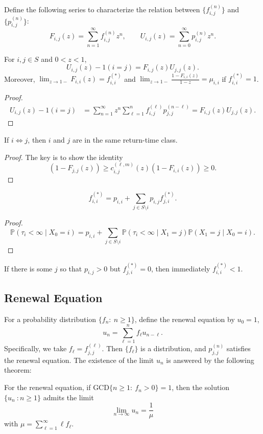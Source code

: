 Define the following series to characterize the relation between $\{f_{i,j}^{(n)}\}$ and $\{p_{i,j}^{(n)}\}$:
\[
F_{i,j}(z)=\sum_{n=1}^\infty f_{i,j}^{(n)}z^n,\qquad
U_{i,j}(z)=\sum_{n=0}^\infty p_{i,j}^{(n)}z^n.
\]
\begin{proposition}
For $i,j\in S$ and $0<z<1$,
\[
U_{i,j}(z)-1(i=j)=F_{i,j}(z)U_{j,j}(z).
\]
Moreover, $\lim_{z\to1-}F_{i,i}(z)=f_{i,i}^{(*)}$ and 
$\lim_{z\to1-}\frac{1-F_{i,i}(z)}{1-z}=\mu_{i,i}$ if $f_{i,i}^{(*)}=1$.
\end{proposition}

\begin{proof}
\begin{align*}
U_{i,j}(z)-1(i=j)&=\sum_{n=1}^\infty z^n\sum_{\ell=1}^nf_{i,j}^{(\ell)}p_{j,j}^{(n-\ell)}=F_{i,j}(z)U_{j,j}(z).
\end{align*}
\end{proof}

\begin{theorem}
If $i\Leftrightarrow j$, then $i$ and $j$ are in the same return-time class.
\end{theorem}
\begin{proof}
The key is to show the identity
\[
(1-F_{j,j}(z))\ge c_{i,j}^{(\ell,m)}(z)(1-F_{i,i}(z))\ge0.
\]
\end{proof}
\begin{proposition}
\[
f_{i,i}^{(*)}=p_{i,i}+\sum_{j\in S\setminus i}p_{i,j}f_{j,i}^{(*)}.
\]
\end{proposition}
\begin{proof}
\[
\mathbb{P}(\tau_i<\infty\mid X_0=i)=p_{i,i}+\sum_{j\in S\setminus i}\mathbb{P}(\tau_i<\infty\mid X_1=j)\mathbb{P}(X_1=j\mid X_0=i).
\]
\end{proof}
If there is some $j$ so that $p_{i,j}>0$ but $f_{j,i}^{(*)}=0$, then immediately $f_{i,i}^{(*)}<1$.


\subsection{Renewal Equation}
For a probability distribution $\{f_n:~n\ge1\}$, define the renewal equation by $u_0=1$,
\[
u_n=\sum_{\ell=1}^nf_{\ell}u_{n-\ell}.
\]
Specifically, we take $f_{\ell}=f_{j,j}^{(\ell)}$. Then $\{f_{\ell}\}$ is a distribution, and $p_{j,j}^{(n)}$ satisfies the renewal equation.
The existence of the limit $u_n$ is answered by the following theorem:

\begin{theorem}
For the renewal equation, if $\text{GCD}\{n\ge1:~f_n>0\}=1$, then the solution $\{u_n~:n\ge1\}$ admits the limit
\[
\lim_{n\to\infty}u_n=\frac{1}{\mu}
\]
with $\mu=\sum_{\ell=1}^\infty\ell f_{\ell}$.
\end{theorem}

